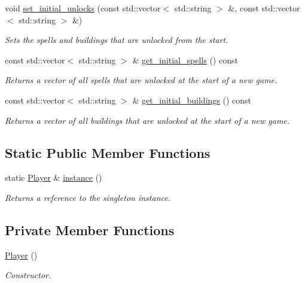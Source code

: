 \begin{DoxyCompactItemize}
void \hyperlink{class_player_a150b3f80378da1ab09eef2a59cf9b173}{set\+\_\+initial\+\_\+unlocks} (const std\+::vector$<$ std\+::string $>$ \&, const std\+::vector$<$ std\+::string $>$ \&)
\begin{DoxyCompactList}\small\item\em Sets the spells and buildings that are unlocked from the start. \end{DoxyCompactList}\item 
const std\+::vector$<$ std\+::string $>$ \& \hyperlink{class_player_aecc0c7b9ab867abdb53fafef44caaa25}{get\+\_\+initial\+\_\+spells} () const 
\begin{DoxyCompactList}\small\item\em Returns a vector of all spells that are unlocked at the start of a new game. \end{DoxyCompactList}\item 
const std\+::vector$<$ std\+::string $>$ \& \hyperlink{class_player_ab6a3ccb259fe7b7dc21e63625166efef}{get\+\_\+initial\+\_\+buildings} () const 
\begin{DoxyCompactList}\small\item\em Returns a vector of all buildings that are unlocked at the start of a new game. \end{DoxyCompactList}\end{DoxyCompactItemize}
\subsection*{Static Public Member Functions}
\begin{DoxyCompactItemize}
\item 
static \hyperlink{class_player}{Player} \& \hyperlink{class_player_a9a4272f12d53223a552c27a064e65187}{instance} ()
\begin{DoxyCompactList}\small\item\em Returns a reference to the singleton instance. \end{DoxyCompactList}\end{DoxyCompactItemize}
\subsection*{Private Member Functions}
\begin{DoxyCompactItemize}
\item 
\hyperlink{class_player_affe0cc3cb714f6deb4e62f0c0d3f1fd8}{Player} ()
\begin{DoxyCompactList}\small\item\em Constructor. \end{DoxyCompactList}\end{DoxyCompactItemize}
